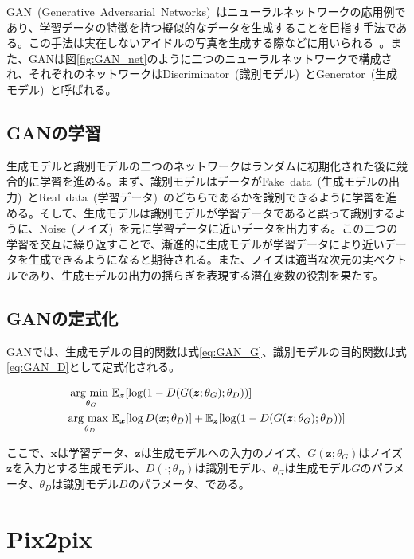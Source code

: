 GAN~(Generative~Adversarial~Networks)~\cite{GAN}はニューラルネットワークの応用例であり、学習データの特徴を持つ擬似的なデータを生成することを目指す手法である。この手法は実在しないアイドルの写真を生成する際などに用いられる~\cite{idol}。また、GANは図\ref{fig:GAN_net}のように二つのニューラルネットワークで構成され、それぞれのネットワークはDiscriminator~(識別モデル)~とGenerator~(生成モデル)~と呼ばれる。

\subsection{GANの学習}

生成モデルと識別モデルの二つのネットワークはランダムに初期化された後に競合的に学習を進める。まず、識別モデルはデータがFake~data~(生成モデルの出力)~とReal~data~(学習データ)~のどちらであるかを識別できるように学習を進める。そして、生成モデルは識別モデルが学習データであると誤って識別するように、Noise~(ノイズ)~を元に学習データに近いデータを出力する。この二つの学習を交互に繰り返すことで、漸進的に生成モデルが学習データにより近いデータを生成できるようになると期待される。また、ノイズは適当な次元の実ベクトルであり、生成モデルの出力の揺らぎを表現する潜在変数の役割を果たす。

\subsection{GANの定式化}

GANでは、生成モデルの目的関数は式\ref{eq:GAN_G}、識別モデルの目的関数は式\ref{eq:GAN_D}として定式化される。

\begin{align}
    \label{eq:GAN_G}
    \mathop{\rm arg~min~}\limits _{\theta_G}& \mathbb{E}_{\boldsymbol{z}}[\log (1-D(G(\boldsymbol{z};\theta_G);\theta_D))]\\
    \label{eq:GAN_D}
    \mathop{\rm arg~max~}\limits _{\theta_D}& \mathbb{E}_{\boldsymbol{x}}[\log D(\boldsymbol{x};\theta_D)]+\mathbb{E}_{\boldsymbol{z}}[\log (1-D(G(\boldsymbol{z};\theta_G);\theta_D))]
\end{align}


ここで、$\boldsymbol{x}$は学習データ、$\boldsymbol{z}$は生成モデルへの入力のノイズ、$G(\boldsymbol{z};\theta_G)$はノイズ$\boldsymbol{z}$を入力とする生成モデル、$D(\cdot;\theta_D)$は識別モデル、$\theta_G$は生成モデル$G$のパラメータ、$\theta_D$は識別モデル$D$のパラメータ、である。

\section{Pix2pix}

